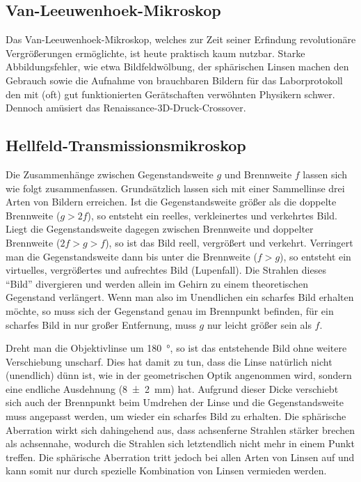 \documentclass[ngerman]{scrartcl}
\begin{document}
\subsection{Van-Leeuwenhoek-Mikroskop}
\label{subsec:diskussion_Leeuwenhoek}

Das Van-Leeuwenhoek-Mikroskop, welches zur Zeit seiner Erfindung revolutionäre Vergrößerungen ermöglichte, ist heute praktisch kaum nutzbar. Starke Abbildungsfehler, wie etwa Bildfeldwölbung, der sphärischen Linsen machen den Gebrauch sowie die Aufnahme von brauchbaren Bildern für das Laborprotokoll den mit (oft) gut funktionierten Gerätschaften verwöhnten Physikern schwer. Dennoch amüsiert das Renaissance-3D-Druck-Crossover.


\subsection{Hellfeld-Transmissionsmikroskop}
\label{subsec:diskussion_hellfeld}

Die Zusammenhänge zwischen Gegenstandsweite $g$ und Brennweite $f$ lassen sich wie folgt zusammenfassen.
Grundsätzlich lassen sich mit einer Sammellinse drei Arten von Bildern erreichen. Ist die Gegenstandsweite größer als die doppelte Brennweite ($g>2f$), so entsteht ein reelles, verkleinertes und verkehrtes Bild. Liegt die Gegenstandsweite dagegen zwischen Brennweite und doppelter Brennweite ($2f>g>f$), so ist das Bild reell, vergrößert und verkehrt. Verringert man die Gegenstandsweite dann bis unter die Brennweite ($f>g$), so entsteht ein virtuelles, vergrößertes und aufrechtes Bild (Lupenfall). Die Strahlen dieses \enquote{Bild} divergieren und werden allein im Gehirn zu einem theoretischen Gegenstand verlängert. Wenn man also im Unendlichen ein scharfes Bild erhalten möchte, so muss sich der Gegenstand genau im Brennpunkt befinden, für ein scharfes Bild in nur großer Entfernung, muss $g$ nur leicht größer sein als $f$.

Dreht man die Objektivlinse um \SI{180}{\degree}, so ist das entstehende Bild ohne weitere Verschiebung unscharf. Dies hat damit zu tun, dass die Linse natürlich nicht (unendlich) dünn ist, wie in der geometrischen Optik angenommen wird, sondern eine endliche Ausdehnung (\SI{8(2)}{mm}) hat. Aufgrund dieser Dicke verschiebt sich auch der Brennpunkt beim Umdrehen der Linse und die Gegenstandsweite muss angepasst werden, um wieder ein scharfes Bild zu erhalten. Die sphärische Aberration wirkt sich dahingehend aus, dass achsenferne Strahlen stärker brechen als achsennahe, wodurch die Strahlen sich letztendlich nicht mehr in einem Punkt treffen. Die sphärische Aberration tritt jedoch bei allen
Arten von Linsen auf und kann somit nur durch spezielle Kombination von Linsen vermieden werden.
\end{document}
